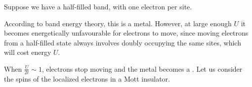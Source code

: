 \documentclass[12pt,a4paper,titlepage]{article}
\newcommand{\ul}[1]{\underline{\smash{#1}}} %
\begin{document}
Suppose we have a half-filled band, with one electron per site.
\begin{center}
\end{center}
According to band energy theory, this is a metal. However, at large enough $U$ it becomes energetically unfavourable for electrons to move, since moving electrons from a half-filled state always involves doubly occupying the same sites, which will cost energy $U$.
\begin{center}
\end{center}
When $\frac{U}{2t}\sim1$, electrons stop moving and the metal becomes a \ul{Mott insulator}. Let us consider the spins of the localized electrons in a Mott insulator.\\
\end{document}
